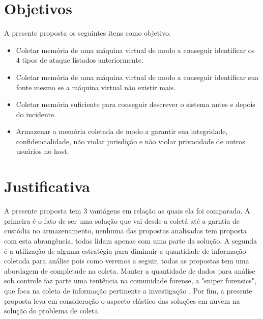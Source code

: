 \documentclass[
	12pt,				%
	openright,			%
	oneside,			%
	a4paper,			%
	english,			%
	brazil,				%
	]{abntex2}
\begin{document}
\section{Objetivos}
\label{chp:intro-objetivos}

A presente proposta os seguintes itens como objetivo.

\begin{itemize}
 \item Coletar memória de uma máquina virtual de modo a conseguir identificar os 4 tipos de ataque listados anteriormente.
 \item Coletar memória de uma máquina virtual de modo a conseguir identificar sua fonte mesmo se a máquina virtual não existir mais.
 \item Coletar memória suficiente para conseguir descrever o sistema antes e depois do incidente.
 \item Armazenar a memória coletada de modo a garantir sua integridade, confidencialidade, não violar jurisdição e não violar privacidade de outros usuários no host.\\
\end{itemize}

\section{Justificativa}
\label{chp:intro-justificativa}

A presente proposta tem 3 vantágens em relação as quais ela foi comparada. A primeira é o fato de ser uma solução que vai desde a coletá até a garntia de custódia no armazenamento, 
nenhuma das propostas analisadas tem proposta com esta abrangência, todas lidam apenas com uma parte da solução. A segunda é a utilização de alguma estratégia para 
diminuir a quantidade de informação coletada para análise pois como veremos a seguir, todas as propostas tem uma abordagem de completude na coleta. Manter a quantidade 
de dados para análise sob controle faz parte uma tentência na comunidade forense, a "sniper forensics", que foca na coleta de informação pertinente a investigação 
\cite{Quick2014}. Por fim, a presente proposta leva em consideração o aspecto elástico das soluções em nuvem na solução do problema de coleta.
\end{document}
